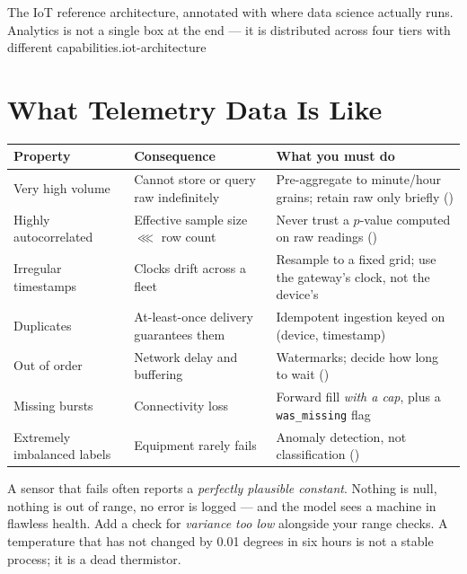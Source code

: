 {The IoT reference architecture, annotated with where data science actually runs. Analytics
is not a single box at the end --- it is distributed across four tiers with different
capabilities.}{iot-architecture}

\section{What Telemetry Data Is Like}

\begin{longtable}{@{}L{3.2cm}L{4.6cm}L{6.4cm}@{}}
\toprule
{}
\textbf{Property} & \textbf{Consequence} & \textbf{What you must do} \\
\midrule
\endhead
Very high volume & Cannot store or query raw indefinitely & Pre-aggregate to minute/hour grains; retain raw only briefly () \\
Highly autocorrelated & Effective sample size $\lll$ row count & Never trust a $p$-value computed on raw readings () \\
Irregular timestamps & Clocks drift across a fleet & Resample to a fixed grid; use the gateway's clock, not the device's \\
Duplicates & At-least-once delivery guarantees them & Idempotent ingestion keyed on (device, timestamp) \\
Out of order & Network delay and buffering & Watermarks; decide how long to wait () \\
Missing bursts & Connectivity loss & Forward fill \emph{with a cap}, plus a \texttt{was\_missing} flag \\
Extremely imbalanced labels & Equipment rarely fails & Anomaly detection, not classification () \\
\bottomrule
\end{longtable}

\begin{alertbox}
A sensor that fails often reports a \emph{perfectly plausible constant}. Nothing is
null, nothing is out of range, no error is logged --- and the model sees a machine
in flawless health. Add a check for \emph{variance too low} alongside your range
checks. A temperature that has not changed by 0.01 degrees in six hours is not a
stable process; it is a dead thermistor.
\end{alertbox}

